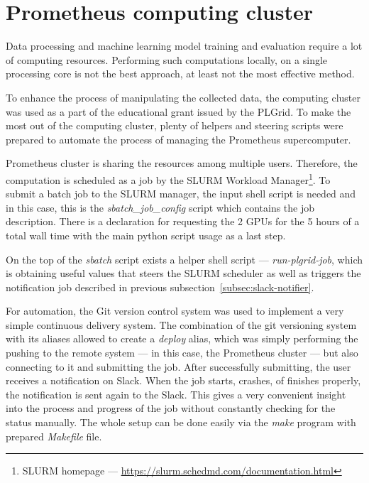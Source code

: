 \section{Prometheus computing cluster}\label{sec:prometheus-computing-cluster}
Data processing and machine learning model training and evaluation require a lot of computing resources.
Performing such computations locally, on a single processing core is not the best approach, at least not the most effective method.

To enhance the process of manipulating the collected data, the computing cluster was used as a part of the educational grant issued by the PLGrid.
To make the most out of the computing cluster, plenty of helpers and steering scripts were prepared to automate the process of managing the Prometheus supercomputer.

Prometheus cluster is sharing the resources among multiple users.
Therefore, the computation is scheduled as a job by the SLURM Workload Manager\footnote{SLURM homepage --- \url{https://slurm.schedmd.com/documentation.html}}.
To submit a batch job to the SLURM manager, the input shell script is needed and in this case, this is the \textit{sbatch\_job\_config} script which contains the job description.
There is a declaration for requesting the 2 GPUs for the 5 hours of a total wall time with the main python script usage as a last step.

On the top of the \textit{sbatch} script exists a helper shell script --- \textit{run-plgrid-job}, which is obtaining useful values that steers the SLURM scheduler as well as triggers the notification job described in previous subsection~\ref{subsec:slack-notifier}.

For automation, the Git version control system was used to implement a very simple continuous delivery system.
The combination of the git versioning system with its aliases allowed to create a \textit{deploy} alias, which was simply performing the pushing to the remote system --- in this case, the Prometheus cluster --- but also connecting to it and submitting the job.
After successfully submitting, the user receives a notification on Slack.
When the job starts, crashes, of finishes properly, the notification is sent again to the Slack.
This gives a very convenient insight into the process and progress of the job without constantly checking for the status manually.
The whole setup can be done easily via the \textit{make} program with prepared \textit{Makefile} file.

